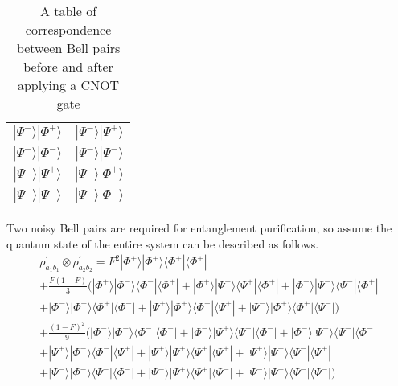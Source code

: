 \begin{table}[ht]
\begin{center}
\begin{tabular}{|c|c|}
      $|\Psi^-\rangle|\Phi^+\rangle$ &  $|\Psi^-\rangle|\Psi^+\rangle$ \\ \cline{1-2}
      $|\Psi^-\rangle|\Phi^-\rangle$ &  $|\Psi^-\rangle|\Psi^-\rangle$ \\ \cline{1-2}
      $|\Psi^-\rangle|\Psi^+\rangle$ &  $|\Psi^-\rangle|\Phi^+\rangle$ \\ \cline{1-2}
      $|\Psi^-\rangle|\Psi^-\rangle$ &  $|\Psi^-\rangle|\Phi^-\rangle$ \\ \cline{1-2}
    \end{tabular}
    \caption{A table of correspondence between Bell pairs before and after applying a CNOT gate}
  \end{center}
\end{table}

Two noisy Bell pairs are required for entanglement purification, so assume the quantum state of the entire system can be described as follows.
\begin{align}
\rho^{'}_{a_1 b_1} \otimes \rho^{'}_{a_2 b_2} = F^2|\Phi^+\rangle|\Phi^+\rangle\langle\Phi^+|\langle\Phi^+| \nonumber\\ 
+ \frac{F(1-F)}{3}(|\Phi^+\rangle|\Phi^-\rangle\langle\Phi^-|\langle\Phi^+|+|\Phi^+\rangle|\Psi^+\rangle\langle\Psi^+|\langle\Phi^+|+|\Phi^+\rangle|\Psi^-\rangle\langle\Psi^-|\langle\Phi^+| \nonumber\\
+|\Phi^-\rangle|\Phi^+\rangle\langle\Phi^+|\langle\Phi^-|+|\Psi^+\rangle|\Phi^+\rangle\langle\Phi^+|\langle\Psi^+|+|\Psi^-\rangle|\Phi^+\rangle\langle\Phi^+|\langle\Psi^-|) \nonumber\\ 
+ \frac{(1-F)^2}{9}(|\Phi^-\rangle|\Phi^-\rangle\langle\Phi^-|\langle\Phi^-|+|\Phi^-\rangle|\Psi^+\rangle\langle\Psi^+|\langle\Phi^-|+|\Phi^-\rangle|\Psi^-\rangle\langle\Psi^-|\langle\Phi^-| \nonumber\\
+ |\Psi^+\rangle|\Phi^-\rangle\langle\Phi^-|\langle\Psi^+|+|\Psi^+\rangle|\Psi^+\rangle\langle\Psi^+|\langle\Psi^+|+|\Psi^+\rangle|\Psi^-\rangle\langle\Psi^-|\langle\Psi^+| \nonumber\\
+|\Psi^-\rangle|\Phi^-\rangle\langle\Psi^-|\langle\Phi^-|+|\Psi^-\rangle|\Psi^+\rangle\langle\Psi^+|\langle\Psi^-|+|\Psi^-\rangle|\Psi^-\rangle\langle\Psi^-|\langle\Psi^-|)
\end{align}

